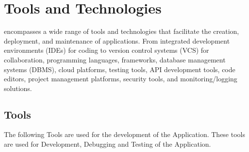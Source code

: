 \chapter{Tools and Technologies}

\justify
{\myprojectname} encompasses a wide range of tools and technologies that facilitate the creation, deployment, and maintenance of applications. From integrated development environments (IDEs) for coding to version control systems (VCS) for collaboration, programming languages, frameworks, database management systems (DBMS), cloud platforms, testing tools, API development tools, code editors, project management platforms, security tools, and monitoring/logging solutions.

\section{Tools}
\justify

The following Tools are used for the development of the Application. These tools are used for Development, Debugging and Testing of the Application.


